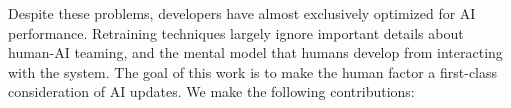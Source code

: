 \documentclass[letterpaper]{article} %
\newcommand{\bug}
    {\mbox{\rule{2mm}{2mm}}}
\newcommand{\Bug}[1]
    {\bug \footnote{BUG: {#1}}}
\newcommand{\eg}{\mbox{\it e.g.}}
\newcommand{\?}{\mbox{?}}
\begin{document}
Despite these problems, developers have almost exclusively optimized for AI performance.  Retraining techniques largely ignore important details about human-AI teaming, and the mental model that humans develop from interacting with the system. %
The goal of this work is to make the human factor a first-class consideration of AI updates. We make the following contributions: 




\end{document}
